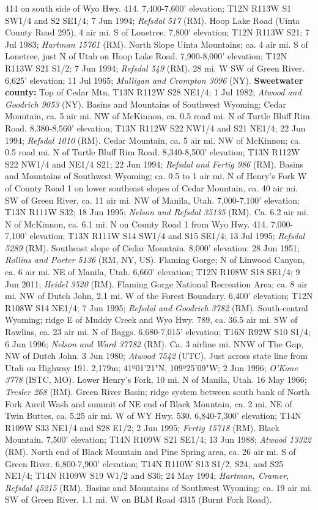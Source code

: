 414 on south side of Wyo Hwy. 414. 7,400-7,600' elevation; T12N R113W S1 SW1/4 and S2 SE1/4; 7 Jun 1994; \textit{Refsdal 517} (RM).  Hoop Lake Road (Uinta County Road 295), 4 air mi. S of Lonetree. 7,800' elevation; T12N R113W S21; 7 Jul 1983; \textit{Hartman 15761} (RM).  North Slope Uinta Mountains; ca. 4 air mi. S of Lonetree, just N of Utah on Hoop Lake Road. 7,900-8,000' elevation; T12N R113W S21 S1/2; 7 Jun 1994; \textit{Refsdal 549} (RM).  28 mi. W SW of Green River. 6,625’ elevation; 11 Jul 1965; \textit{Mulligan and Crompton 3096} (NY).  \textbf{Sweetwater county:} Top of Cedar Mtn. T13N R112W S28 NE1/4; 1 Jul 1982; \textit{Atwood and Goodrich 9053} (NY).  Basins and Mountains of Southwest Wyoming; Cedar Mountain, ca. 5 air mi. NW of McKinnon, ca. 0.5 road mi. N of Turtle Bluff Rim Road. 8,380-8,560' elevation; T13N R112W S22 NW1/4 and S21 NE1/4; 22 Jun 1994; \textit{Refsdal 1010} (RM).  Cedar Mountain, ca. 5 air mi. NW of McKinnon; ca. 0.5 road mi. N of Turtle Bluff Rim Road. 8,340-8,500' elevation; T13N R112W S22 NW1/4 and NE1/4 S21; 22 Jun 1994; \textit{Refsdal and Fertig 986} (RM).  Basins and Mountains of Southwest Wyoming; ca. 0.5 to 1 air mi. N of Henry's Fork W of County Road 1 on lower southeast slopes of Cedar Mountain, ca. 40 air mi. SW of Green River, ca. 11 air mi. NW of Manila, Utah. 7,000-7,100' elevation; T13N R111W S32; 18 Jun 1995; \textit{Nelson and Refsdal 35135} (RM).  Ca. 6.2 air mi. N of McKinnon, ca. 6.1 mi. N on County Road 1 from Wyo Hwy. 414. 7,000-7,100' elevation; T13N R111W S14 SW1/4 and S15 SE1/4; 13 Jul 1995; \textit{Refsdal 5289} (RM).  Southeast slope of Cedar Mountain. 8,000' elevation; 28 Jun 1951; \textit{Rollins and Porter 5136} (RM, NY, US).  Flaming Gorge; N of Linwood Canyon, ca. 6 air mi. NE of Manila, Utah. 6,660' elevation; T12N R108W S18 SE1/4; 9 Jun 2011; \textit{Heidel 3520} (RM).  Flaming Gorge National Recreation Area; ca. 8 air mi. NW of Dutch John, 2.1 mi. W of the Forest Boundary. 6,400' elevation; T12N R108W S14 NE1/4; 7 Jun 1995; \textit{Refsdal and Goodrich 3782} (RM).  South-central Wyoming; ridge E of Muddy Creek and Wyo Hwy. 789, ca. 36.5 air mi. SW of Rawlins, ca. 23 air mi. N of Baggs. 6,680-7,015' elevation; T16N R92W S10 S1/4; 6 Jun 1996; \textit{Nelson and Ward 37782} (RM).  Ca. 3 airline mi. NNW of The Gap, NW of Dutch John.	3 Jun 1980; \textit{Atwood 7542} (UTC).  Just across state line from Utah on Highway 191. 2,179m; 41º01'21"N, 109º25'09"W; 2 Jun 1996; \textit{O'Kane 3778} (ISTC, MO).  Lower Henry's Fork, 10 mi. N of Manila, Utah. 16 May 1966; \textit{Tresler 268} (RM).  Green River Basin; ridge system between south bank of North Fork Anvil Wash and summit of NE end of Black Mountain, ca. 2 mi. NE of Twin Buttes, ca. 5.25 air mi. W of WY Hwy. 530.  6,840-7,300' elevation; T14N R109W S33 NE1/4 and S28 E1/2; 2 Jun 1995; \textit{Fertig 15718} (RM).  Black Mountain. 7,500' elevation; T14N R109W S21 SE1/4; 13 Jun 1988; \textit{Atwood 13322} (RM).  North end of Black Mountain and Pine Spring area, ca. 26 air mi. S of Green River. 6,800-7,900' elevation; T14N R110W S13 S1/2, S24, and S25 NE1/4; T14N R109W S19 W1/2 and S30; 24 May 1994; \textit{Hartman, Cramer, Refsdal 45215} (RM).  Basins and Mountains of Southwest Wyoming; ca. 19 air mi. SW of Green River, 1.1 mi. W on BLM Road 4315 (Burnt Fork Road).  